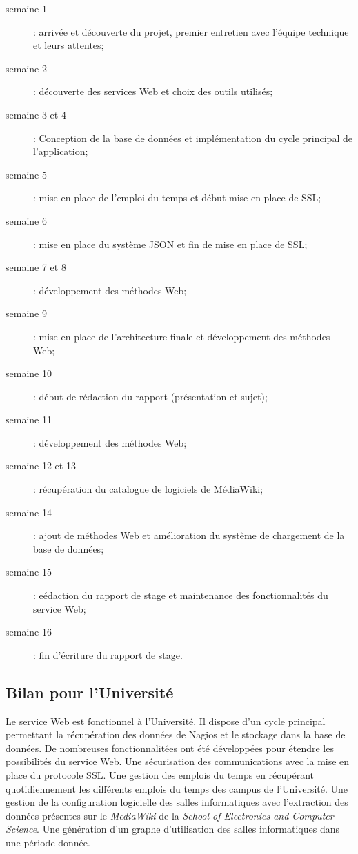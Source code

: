 \begin{description}
	\item[semaine 1] : arriv\'ee et d\'ecouverte du projet, premier entretien avec l'\'equipe technique et leurs attentes;
	\item[semaine 2] : d\'ecouverte des services Web et choix des outils utilis\'es;
	\item[semaine 3 et 4] : Conception de la base de donn\'ees et impl\'ementation du cycle principal de l'application;
	\item[semaine 5] : mise en place de l'emploi du temps et d\'ebut mise en place de SSL;
	\item[semaine 6] : mise en place du syst\`eme JSON et fin de mise en place de SSL;
	\item[semaine 7 et 8] : d\'eveloppement des m\'ethodes Web;
	\item[semaine 9] : mise en place de l'architecture finale et d\'eveloppement des m\'ethodes Web;
	\item[semaine 10] : d\'ebut de r\'edaction du rapport (pr\'esentation et sujet);
	\item[semaine 11] : d\'eveloppement des m\'ethodes Web;
	\item[semaine 12 et 13] : r\'ecup\'eration du catalogue de logiciels de M\'ediaWiki;
	\item[semaine 14] : ajout de m\'ethodes Web et am\'elioration du syst\`eme de chargement de la base de donn\'ees;
	\item[semaine 15] : e\'edaction du rapport de stage et maintenance des fonctionnalit\'es du service Web;
	\item[semaine 16] : fin d'\'ecriture du rapport de stage.

\end{description}

\subsection{Bilan pour l'Universit\'e}

Le service Web est fonctionnel \`a l'Universit\'e.
Il dispose d'un cycle principal permettant la r\'ecup\'eration des donn\'ees de Nagios et le stockage dans la base de donn\'ees.
De nombreuses fonctionnalit\'ees ont \'et\'e d\'evelopp\'ees pour \'etendre les possibilit\'es du service Web.
Une s\'ecurisation des communications avec la mise en place du protocole SSL.
Une gestion des emplois du temps en r\'ecup\'erant quotidiennement les diff\'erents emplois du temps des campus de l'Universit\'e.
Une gestion de la configuration logicielle des salles informatiques avec l'extraction des donn\'ees pr\'esentes sur le \textit{MediaWiki} de la \textit{School of Electronics and Computer Science}.
Une g\'en\'eration d'un graphe d'utilisation des salles informatiques dans une p\'eriode donn\'ee.

